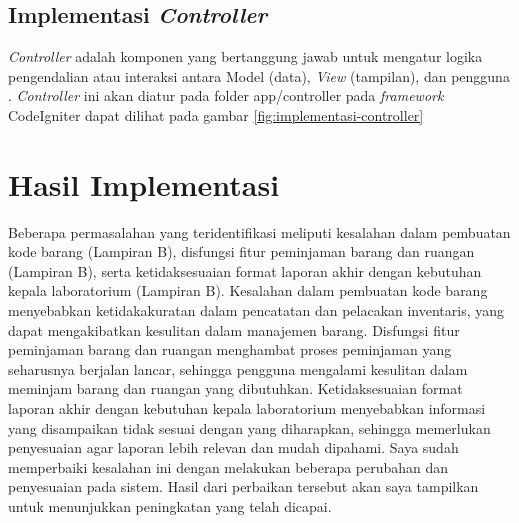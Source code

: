 \subsection{Implementasi \textit{Controller}}
\textit{Controller} adalah komponen yang bertanggung jawab untuk mengatur logika pengendalian atau interaksi antara Model (data), \textit{View} (tampilan), dan pengguna \cite{rahman2018perancangan}. \textit{Controller} ini akan diatur pada folder app/controller pada \textit{framework} CodeIgniter dapat dilihat pada gambar \ref{fig:implementasi-controller}



\section{Hasil Implementasi}
Beberapa permasalahan yang teridentifikasi meliputi kesalahan dalam pembuatan kode barang (Lampiran B), disfungsi fitur peminjaman barang dan ruangan (Lampiran B), serta ketidaksesuaian format laporan akhir dengan kebutuhan kepala laboratorium (Lampiran B). Kesalahan dalam pembuatan kode barang menyebabkan ketidakakuratan dalam pencatatan dan pelacakan inventaris, yang dapat mengakibatkan kesulitan dalam manajemen barang. Disfungsi fitur peminjaman barang dan ruangan menghambat proses peminjaman yang seharusnya berjalan lancar, sehingga pengguna mengalami kesulitan dalam meminjam barang dan ruangan yang dibutuhkan. Ketidaksesuaian format laporan akhir dengan kebutuhan kepala laboratorium menyebabkan informasi yang disampaikan tidak sesuai dengan yang diharapkan, sehingga memerlukan penyesuaian agar laporan lebih relevan dan mudah dipahami. Saya sudah memperbaiki kesalahan ini dengan melakukan beberapa perubahan dan penyesuaian pada sistem. Hasil dari perbaikan tersebut akan saya tampilkan untuk menunjukkan peningkatan yang telah dicapai.

